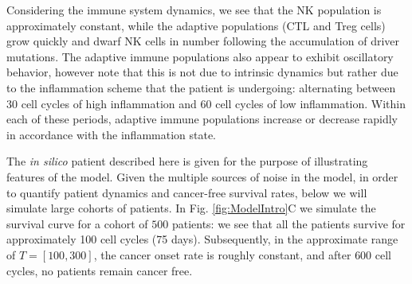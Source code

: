 \documentclass[11pt]{article}
\begin{document}
\par 
Considering the immune system dynamics, we see that the NK population is approximately constant, while the adaptive populations (CTL and Treg cells) grow quickly and dwarf NK cells in number following the accumulation of driver mutations.
The adaptive immune populations also appear to exhibit oscillatory behavior, however note that this is not due to intrinsic dynamics but rather due to the inflammation scheme that the patient is undergoing: alternating between 30 cell cycles of high inflammation and 60 cell cycles of low inflammation. Within each of these periods, adaptive immune populations increase or decrease rapidly in accordance with the inflammation state.
\par 
The {\em in silico} patient described here is given for the purpose of illustrating features of the model. Given the multiple sources of noise in the model, in order to quantify patient dynamics and cancer-free survival rates, below we will simulate large cohorts of patients. In Fig. \ref{fig:ModelIntro}C we simulate the survival curve for a cohort of $500$ patients: we see that all the patients survive for approximately 100 cell cycles (75 days). Subsequently, in the approximate range of $T= [100,300]$, the cancer onset rate is roughly constant, and after $600$ cell cycles, no patients remain cancer free.
\end{document}
